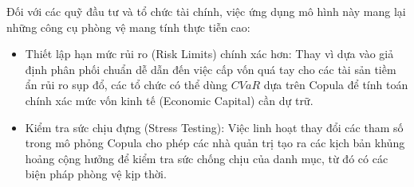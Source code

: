 Đối với các quỹ đầu tư và tổ chức tài chính, việc ứng dụng mô hình này mang lại những công cụ phòng vệ mang tính thực tiễn cao:
\begin{itemize}
    \item Thiết lập hạn mức rủi ro (Risk Limits) chính xác hơn: Thay vì dựa vào giả định phân phối chuẩn dễ dẫn đến việc cấp vốn quá tay cho các tài sản tiềm ẩn rủi ro sụp đổ, các tổ chức có thể dùng $CVaR$ dựa trên Copula để tính toán chính xác mức vốn kinh tế (Economic Capital) cần dự trữ.
    \item Kiểm tra sức chịu đựng (Stress Testing): Việc linh hoạt thay đổi các tham số trong mô phỏng Copula cho phép các nhà quản trị tạo ra các kịch bản khủng hoảng cộng hưởng để kiểm tra sức chống chịu của danh mục, từ đó có các biện pháp phòng vệ kịp thời.
\end{itemize}
